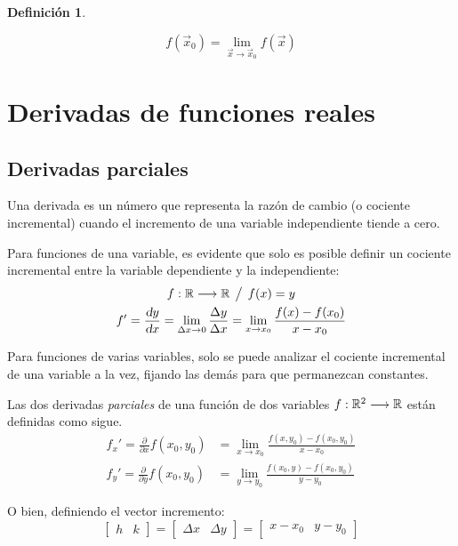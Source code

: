 \documentclass[a5paper,12pt,twoside]{book}
\newtheorem{defn}{{Definición}}[chapter]
\begin{document}
\begin{mdframed}[style=MyFrame1]
    \begin{defn}
    \end{defn}
    \begin{equation*}
        f(\Vec{x}_0)= \lim_{\Vec{x} \to \Vec{x}_0} f(\Vec{x})
    \end{equation*}
\end{mdframed}


\chapter{Derivadas de funciones reales}


\section{Derivadas parciales}

Una derivada es un número que representa la razón de cambio (o cociente incremental) cuando el incremento de una variable independiente tiende a cero.

Para funciones de una variable, es evidente que solo es posible definir un cociente incremental entre la variable dependiente y la independiente:
\begin{gather*}
    f:\mathbb{R}\longrightarrow\mathbb{R} \hspace{1ex} \big/ \hspace{1ex} f(x)=y
    \\
    f' = \frac{\textsl{d} y}{\textsl{d} x} = \lim_{\Delta x \to 0} \frac{\Delta y}{\Delta x} = \lim_{x \to x_0} \frac{f(x)-f(x_0)}{x-x_0}
\end{gather*}

Para funciones de varias variables, solo se puede analizar el cociente incremental de una variable a la vez, fijando las demás para que permanezcan constantes.

Las dos derivadas \emph{parciales} de una función de dos variables $f:\mathbb{R}^2 \longrightarrow \mathbb{R}$ están definidas como sigue.
\begin{align*}
    f_x' = \frac{\partial}{\partial x} f(x_0,y_0) &= \lim_{x \to x_0} \frac{f(x,y_0)-f(x_0,y_0)}{x-x_0}
    \\[1ex]
    f_y' = \frac{\partial}{\partial y} f(x_0,y_0) &= \lim_{y \to y_0} \frac{f(x_0,y)-f(x_0,y_0)}{y-y_0}
\end{align*}

O bien, definiendo el vector incremento:
\begin{equation*}
    \begin{bmatrix} h & k \end{bmatrix}
    = \begin{bmatrix} \Delta x & \Delta y \end{bmatrix}
    = \begin{bmatrix} x-x_0 & y-y_0 \end{bmatrix}
\end{equation*}
\end{document}
